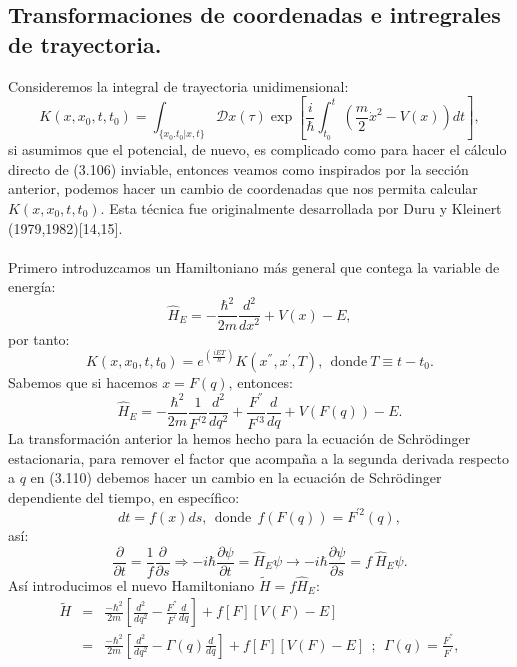 \subsection{Transformaciones de coordenadas e intregrales de trayectoria.}
Consideremos la integral de trayectoria unidimensional:
\begin{equation}
K(x,x_{0},t,t_{0})=\int_{\{x_{0}.t_{0}|x,t\}}\mathcal{D}x(\tau)\exp\left[\frac{i}{\hbar}\int_{t_{0}}^{t}\left(\frac{m}{2}\dot{x}^{2}-V(x)\right)dt\right] ,
\end{equation}
si asumimos que el potencial, de nuevo, es complicado como para hacer el cálculo directo de (3.106) inviable, entonces veamos como inspirados por la sección anterior, podemos hacer un cambio de coordenadas que nos permita calcular $K(x,x_{0},t,t_{0})$. Esta técnica fue originalmente desarrollada por Duru y Kleinert (1979,1982)[14,15].
\\
\\
Primero introduzcamos un Hamiltoniano más general que contega la variable de energía:
\begin{equation}
\hat{H}_{E}=-\frac{\hbar^{2}}{2m}\frac{d^{2}}{dx^{2}}+V(x)-E,
\end{equation}
por tanto:
\begin{equation}
K(x,x_{0},t,t_{0})=e^{ \left(\frac{iET}{\hbar}\right)}K(x^{''},x^{'},T),\ \  \text{donde}\ T\equiv t-t_0. 
\end{equation}
Sabemos que si hacemos $x=F(q)$, entonces:
\begin{equation}
\hat{H}_{E}=-\frac{\hbar^{2}}{2m}\frac{1}{F^{'2}}\frac{d^{2}}{dq^{2}}+\frac{F^{''}}{F^{'3}}\frac{d}{dq}+V(F(q))-E.
\end{equation} 
La transformación anterior la hemos hecho para la ecuación de Schrödinger estacionaria, para remover el factor que acompaña a la segunda derivada respecto a $q$ en (3.110) debemos hacer un cambio en la ecuación de Schrödinger dependiente del tiempo, en específico:
\begin{equation}
dt=f(x)ds,\ \ \text{donde}\ \ f(F(q))=F^{'2}(q),
\end{equation}
así:
\begin{equation}
\frac{\partial}{\partial t}=\frac{1}{f}\frac{\partial}{\partial s}\Rightarrow-i\hbar\frac{\partial\psi}{\partial t}=\hat{H}_{E}\psi\to-i\hbar\frac{\partial\psi}{\partial s}=f\ \hat{H}_{E}\psi .
\end{equation}
Así introducimos el nuevo Hamiltoniano $\tilde{H}=f\hat{H}_E$:
\begin{eqnarray}
\nonumber \tilde{H}&=&\frac{-\hbar^{2}}{2m}\left[\frac{d^{2}}{dq^{2}}-\frac{F^{''}}{F^{'}}\frac{d}{dq}\right]+f[F]\left[V(F)-E\right]\\
&=& \frac{-\hbar^{2}}{2m}\left[\frac{d^{2}}{dq^{2}}-\Gamma(q)\frac{d}{dq}\right]+f[F]\left[V(F)-E\right]\ \ ;\ \ \Gamma(q)=\frac{F^{''}}{F^{'}},
\end{eqnarray}
